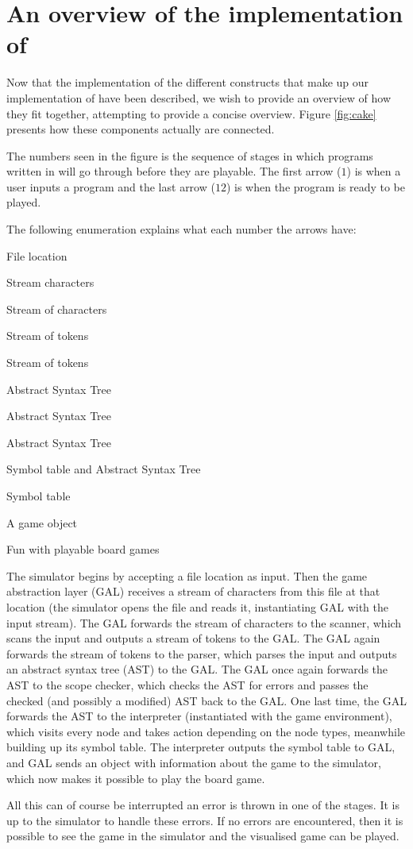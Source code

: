 \section{An overview of the implementation of \productname{}}
\label{anoverviewofjunta}

Now that the implementation of the different constructs that make up our
implementation of \productname{} have been described, we wish to provide
an overview of how they fit together, attempting to provide a concise
overview. Figure \ref{fig:cake} presents how these components actually
are connected.



The numbers seen in the figure is the sequence of stages in which programs 
written in \productname{} will go through before they are playable. The first
arrow ($1$) is when a user inputs a program and the last arrow ($12$) is when
the program is ready to be played.

The following enumeration explains what each number the arrows have:

\begin{nlist}
\item File location
\item Stream characters
\item Stream of characters
\item Stream of tokens
\item Stream of tokens
\item Abstract Syntax Tree
\item Abstract Syntax Tree
\item Abstract Syntax Tree
\item Symbol table and Abstract Syntax Tree
\item Symbol table
\item A game object 
\item Fun with playable board games
\end{nlist}

The simulator begins by accepting a file location as input. Then the
game abstraction layer (GAL) receives a stream of characters from
this file at that location (the simulator opens the file and reads
it, instantiating GAL with the input stream). The GAL forwards the
stream of characters to the scanner, which scans the input and outputs
a stream of tokens to the GAL. The GAL again forwards the stream of
tokens to the parser, which parses the input and outputs an abstract
syntax tree (AST) to the GAL. The GAL once again forwards the AST to
the scope checker, which checks the AST for errors and passes the
checked (and possibly a modified) AST back to the GAL. One last time,
the GAL forwards the AST to the interpreter (instantiated with the game
environment), which visits every node and takes action depending on the
node types, meanwhile building up its symbol table. The interpreter
outputs the symbol table to GAL, and GAL sends an object with information
about the game to the simulator, which now makes it possible to play the
board game.

All this can of course be interrupted an error is thrown in one of the
stages. It is up to the simulator to handle these errors. If no errors
are encountered, then it is possible to see the game in the simulator and
the visualised game can be played.
